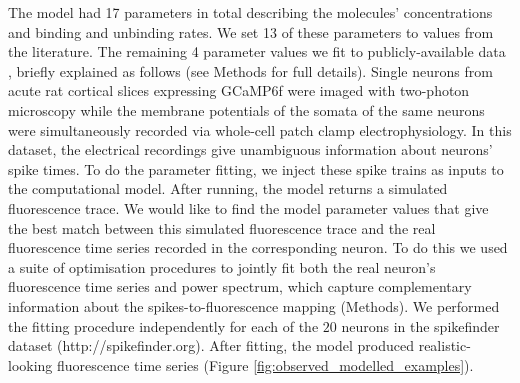 \documentclass[a4paper,12pt]{article}
\theoremstyle{definition}
\begin{document}
The model had 17 parameters in total describing the molecules’ concentrations and binding and unbinding rates. We set 13 of these parameters to values from the literature. The remaining 4 parameter values we fit to publicly-available data \cite{berens}, briefly explained as follows (see Methods for full details).  Single neurons from acute rat cortical slices expressing GCaMP6f were imaged with two-photon microscopy while the membrane potentials of the somata of the same neurons were simultaneously recorded via whole-cell patch clamp electrophysiology. In this dataset, the electrical recordings give unambiguous information about neurons' spike times. To do the parameter fitting, we inject these spike trains as inputs to the computational model. After running, the model returns a simulated fluorescence trace. We would like to find the model parameter values that give the best match between this simulated fluorescence trace and the real fluorescence time series recorded in the corresponding neuron. To do this we used a suite of optimisation procedures to jointly fit both the real neuron’s fluorescence time series and power spectrum, which capture complementary information about the spikes-to-fluorescence mapping (Methods). We performed the fitting procedure independently for each of the $20$ neurons in the spikefinder dataset (http://spikefinder.org). After fitting, the model produced realistic-looking fluorescence time series (Figure \ref{fig:observed_modelled_examples}). 
\end{document}
